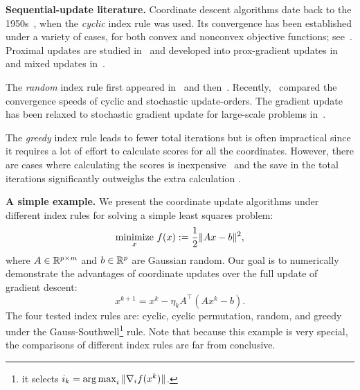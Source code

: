 
\textbf{Sequential-update literature.} Coordinate descent algorithms date back to the 1950s~\cite{hildreth1957quadprog}, when the \emph{cyclic} index rule was used. Its convergence has been established under a variety of cases, for both convex and nonconvex objective functions; see~\cite{Warga-63,zadeh1970note, Sargent-Sebastian-73,Han-88,luo1992convergence, Tseng-93, Grippo-Sciandrone-00, Tseng-01, razaviyayn2013unified, beck2013convergence, hong2015iteration, wright2015coordinate}. Proximal updates are studied in~\cite{Grippo-Sciandrone-00, attouch2010proximal} and developed into prox-gradient updates in~\cite{tseng2009_CGD, tseng2009block-linear, bolte2014proximal} and mixed updates in~\cite{XY_2013_multiblock}.

The \emph{random} index rule first appeared in~\cite{nesterov2012cd} and then~\cite{richtarik2014iteration, Lu_Xiao_rbcd_2015}. Recently,~\cite{XY_2014_ecd,Xu2015_APG_NTD} compared the convergence speeds of cyclic and stochastic update-orders. The gradient update has been relaxed to  stochastic gradient update for large-scale problems in~\cite{DangLan-SBMD, XY_2015_bsg}. 

The \emph{greedy} index rule leads to fewer total iterations but is often impractical since it requires a lot of effort to calculate  scores for all the coordinates. However, there are cases where calculating the scores is inexpensive~\cite{bertsekas1999nonlinear, li2009gcoord, wu2008coordinate} and the save in the total iterations significantly outweighs the extra calculation \cite{tseng2009_CGD, dhillon2011nearest, PYY_2013_GRock, schmidt2014coordinate}. 

\textbf{A simple example.} We present the coordinate update algorithms under different index rules for solving a simple least squares problem:  %
$$\operatorname*{minimize}_{x}\, f(x):= \frac{1}{2} \|A x - b\|^2,$$
where $A \in \mathbb{R}^{p \times m}$ and $b \in \mathbb{R}^p$ are Gaussian random. Our goal is to numerically demonstrate the advantages of coordinate updates over the  full update of  gradient descent:
$$x^{k+1} = x^k - \eta_k A^{\top}(A x^k - b).$$
The four tested index rules are: cyclic, cyclic permutation, random, and greedy under the Gauss-Southwell\footnote{it selects $i_k=\operatorname*{arg\,max}_i\|\nabla_if(x^k)\|$.} rule. 
Note that because this example is very special, the comparisons of different index rules are far from conclusive. 

